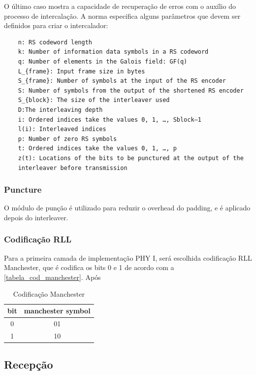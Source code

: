 	O último caso mostra a capacidade de recuperação de erros com o auxílio do processo de intercalação. A norma especifica alguns parâmetros que devem ser definidos para criar o intercalador:
	
	\begin{verbatim}
	n: RS codeword length
	k: Number of information data symbols in a RS codeword
	q: Number of elements in the Galois field: GF(q)
	L_{frame}: Input frame size in bytes
	S_{frame}: Number of symbols at the input of the RS encoder
	S: Number of symbols from the output of the shortened RS encoder
	S_{block}: The size of the interleaver used
	D:The interleaving depth
	i: Ordered indices take the values 0, 1, …, Sblock–1
	l(i): Interleaved indices
	p: Number of zero RS symbols
	t: Ordered indices take the values 0, 1, …, p
	z(t): Locations of the bits to be punctured at the output of the 
	interleaver before transmission 
	\end{verbatim}
	
	\subsubsection{Puncture}
	
	O módulo de punção é utilizado para reduzir o overhead do padding, e é aplicado depois do interleaver.
	
	\subsubsection{Codificação RLL}
	
	Para a primeira camada de implementação PHY I, será escolhida codificação RLL Manchester, que é codifica os bits 0 e 1 de acordo com a \autoref{tabela_cod_manchester}. Após 
	
	\begin{table}[ht]
		\caption{Codificação Manchester}
		\centering
		\begin{tabular}{c c}
			\hline
			bit & manchester symbol \\ \hline
			0 & 01 \\
			1 & 10 \\ \hline
		\end{tabular}
		\label{tabela_cod_manchester}
	\end{table}
	
	\subsection{Recepção}
	
